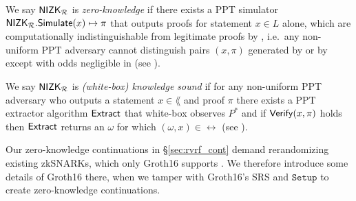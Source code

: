\begin{definition}\label{def:nizk_zero_knowledge}
We say ${\mathsf{NIZK}}_\mathcal{R}$ is {\em zero-knowledge} if
there exists a PPT simulator ${\mathsf{NIZK}}_\mathcal{R}.{\mathsf{Simulate}}(x) \mapsto \pi$
that outputs proofs for statement $x \in L$ alone, which are
computationally indistinguishable from legitimate proofs by \Prove,
i.e.\ any non-uniform PPT adversary \advV cannot distinguish pairs $(x,\pi)$
generated by \Simulate or by \Prove except with odds negligible in \secparam
(see \cite[Def. 9, \S A, pap. 29]{RandomizationGroth16}). %
\end{definition}

\def\advP{\ensuremath{P^*}\xspace} %

\begin{definition}\label{def:nizk_knowledge_sound}
We say ${\mathsf{NIZK}}_\mathcal{R}$ is {\em (white-box) knowledge sound} if
for any non-uniform PPT adversary \adv who outputs a statement $x \in \lang$ and proof $\pi$
there exists a PPT extractor algorithm ${\mathsf{Extract}}$ that white-box observes $\advP$ and
if ${\mathsf{Verify}}(x,\pi)$ holds then ${\mathsf{Extract}}$ returns an $\omega$ for which $(\omega,x) \in \rel$
(see \cite[Def. 7, \S A, pap. 29]{RandomizationGroth16}).
\end{definition}

Our zero-knowledge continuations in \S\ref{sec:rvrf_cont} demand
rerandomizing existing zkSNARKs, which only Groth16 supports \cite{Groth16}.
We therefore introduce some details of Groth16 \cite{Groth16} there,
when we tamper with Groth16's SRS and $\mathtt{Setup}$ to create zero-knowledge continuations. 

%

